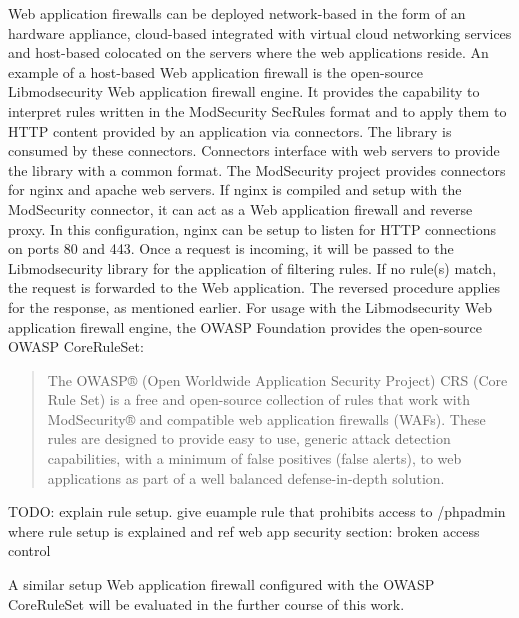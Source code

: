 Web application firewalls can be deployed network-based in the form of an hardware appliance, cloud-based integrated with virtual cloud networking services and host-based colocated on the servers where the web applications reside. \cite{palo/waf}
An example of a host-based Web application firewall is the open-source Libmodsecurity Web application firewall engine.
It provides the capability to interpret rules written in the ModSecurity SecRules format and to apply them to HTTP content provided by an application via connectors.
The library is consumed by these connectors. Connectors interface with web servers to provide the library with a common format.
The ModSecurity project provides connectors for nginx and apache web servers.
If nginx is compiled and setup with the ModSecurity connector, it can act as a Web application firewall and reverse proxy. \cite{modsec/home, modsec/nginx}
In this configuration, nginx can be setup to listen for HTTP connections on ports 80 and 443.
Once a request is incoming, it will be passed to the Libmodsecurity library for the application of filtering rules.
If no rule(s) match, the request is forwarded to the Web application. The reversed procedure applies for the response, as mentioned earlier.
For usage with the Libmodsecurity Web application firewall engine, the OWASP Foundation provides the open-source OWASP CoreRuleSet:

\begin{quote}
	The OWASP® (Open Worldwide Application Security Project) CRS (Core Rule Set) is a free and open-source collection of rules that work with ModSecurity® and compatible web application firewalls (WAFs). These rules are designed to provide easy to use, generic attack detection capabilities, with a minimum of false positives (false alerts), to web applications as part of a well balanced defense-in-depth solution. \cite{OWASP/crshome}
\end{quote}

{\color{red} TODO: explain rule setup. give euample rule that prohibits access to /phpadmin where rule setup is explained and ref web app security section: broken access control}

A similar setup Web application firewall configured with the OWASP CoreRuleSet will be evaluated in the further course of this work.
